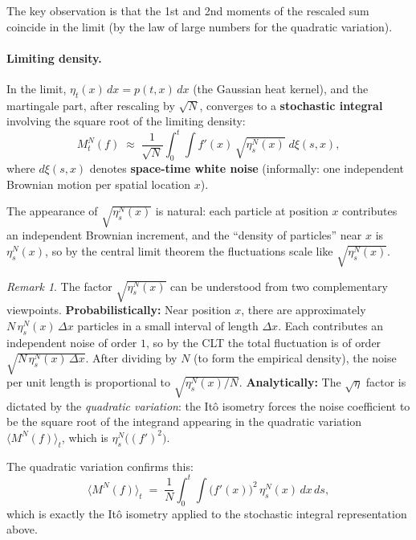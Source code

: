 \documentclass[11pt]{article}
\theoremstyle{definition}
\theoremstyle{remark}
\newtheorem{remark}{Remark}
\begin{document}
The key observation is that the 1st and 2nd moments
of the rescaled sum coincide in the limit
(by the law of large numbers for the quadratic variation).

\paragraph{Limiting density.}

In the limit, $\eta_t(x)\,dx = p(t,x)\,dx$
(the Gaussian heat kernel), and the martingale part,
after rescaling by $\sqrt{N}$, converges to a
\textbf{stochastic integral} involving the
square root of the limiting density:
\[
    M_t^N(f)
    \;\approx\;
    \frac{1}{\sqrt{N}}
    \int_0^t \!\!\int
    f'(x)\,\sqrt{\eta_s^N(x)}\;
    d\xi(s, x),
\]
where $d\xi(s,x)$ denotes \textbf{space-time white noise}
(informally: one independent Brownian motion per spatial location $x$).

The appearance of $\sqrt{\eta_s^N(x)}$ is natural:
each particle at position $x$ contributes an independent
Brownian increment, and the ``density of particles'' near $x$
is $\eta_s^N(x)$, so by the central limit theorem the
fluctuations scale like $\sqrt{\eta_s^N(x)}$.

\begin{remark}
The factor $\sqrt{\eta_s^N(x)}$ can be understood from two complementary viewpoints.
\textbf{Probabilistically:} Near position $x$, there are approximately $N\,\eta_s^N(x)\,\Delta x$ particles in a small interval of length $\Delta x$.  Each contributes an independent noise of order $1$, so by the CLT the total fluctuation is of order $\sqrt{N\,\eta_s^N(x)\,\Delta x}$.  After dividing by $N$ (to form the empirical density), the noise per unit length is proportional to $\sqrt{\eta_s^N(x)/N}$.
\textbf{Analytically:} The $\sqrt{\eta}$ factor is dictated by the \emph{quadratic variation}: the It\^o isometry forces the noise coefficient to be the square root of the integrand appearing in the quadratic variation $\langle M^N(f)\rangle_t$, which is $\eta_s^N\bigl((f')^2\bigr)$.
\end{remark}

The quadratic variation confirms this:
\[
    \bigl\langle M^N(f)\bigr\rangle_t
    \;=\;
    \frac{1}{N}
    \int_0^t \!\!\int
    \bigl(f'(x)\bigr)^2\,\eta_s^N(x)\,dx\,ds,
\]
which is exactly the Itô isometry applied to the
stochastic integral representation above.
\end{document}
